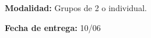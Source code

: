 \documentclass[a4paper,11pt]{exam}
\begin{document}
\maketitle



\vspace{\interline}

\textbf{Modalidad:} Grupos de 2 o individual.

\textbf{Fecha de entrega:} 10/06

\vspace{\interline}



\vspace{\interline}


\end{document}
